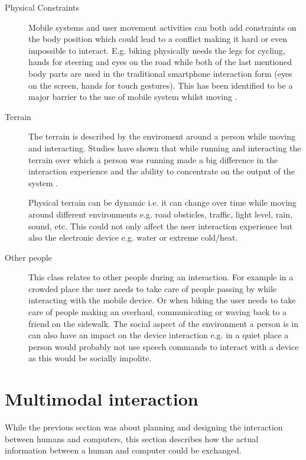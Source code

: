 \begin{description}
\item[Physical Constraints]
Mobile systems and user movement activities can both add constraints on the body position which could lead to a conflict making it hard or even impossible to interact. E.g. biking physically needs the legs for cycling, hands for steering and eyes on the road while both of the last mentioned body parts are used in the traditional smartphone interaction form (eyes on the screen, hands for touch gestures). This has been identified to be a major barrier to the use of mobile system whilst moving \cite{pielot_pocketmenu:_2012}.

\item[Terrain]
The terrain is described by the enviroment around a person while moving and interacting. Studies have shown that while running and interacting the terrain over which a person was running made a big difference in the interaction experience and the ability to concentrate on the output of the system \cite{marshall_using_2011}.

Physical terrain can be dynamic i.e. it can change over time while moving around different environments e.g. road obsticles, traffic, light level, rain, sound, etc. This could not only affect the user interaction experience but also the electronic device e.g. water or extreme cold/heat.

\item[Other people]
This class relates to other people during an interaction. For example in a crowded place the user needs to take care of people passing by while interacting with the mobile device. Or when biking the user needs to take care of people making an overhaul, communicating or waving back to a friend on the sidewalk. The social aspect of the environment a person is in can also have an impact on the device interaction e.g. in a quiet place a person would probably not use speech commands to interact with a device as this would be socially impolite.
\end{description}


\section{Multimodal interaction}
While the previous section was about planning and designing the interaction between humans and computers, this section describes how the actual information between a human and computer could be exchanged. 

